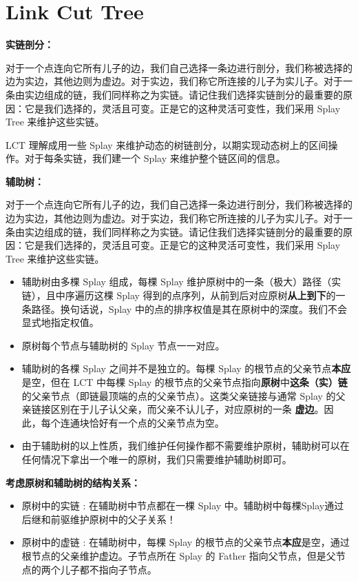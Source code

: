 \section{Link Cut Tree}

\par \noindent \textbf{实链剖分：}
~\\
\par \noindent 对于一个点连向它所有儿子的边，我们自己选择一条边进行剖分，我们称被选择的边为实边，其他边则为虚边。对于实边，我们称它所连接的儿子为实儿子。对于一条由实边组成的链，我们同样称之为实链。请记住我们选择实链剖分的最重要的原因：它是我们选择的，灵活且可变。正是它的这种灵活可变性，我们采用 Splay Tree 来维护这些实链。
~\\
\par \noindent LCT 理解成用一些 Splay 来维护动态的树链剖分，以期实现动态树上的区间操作。对于每条实链，我们建一个 Splay 来维护整个链区间的信息。
~\\
\par \noindent \textbf{辅助树：}
~\\
\par \noindent 对于一个点连向它所有儿子的边，我们自己选择一条边进行剖分，我们称被选择的边为实边，其他边则为虚边。对于实边，我们称它所连接的儿子为实儿子。对于一条由实边组成的链，我们同样称之为实链。请记住我们选择实链剖分的最重要的原因：它是我们选择的，灵活且可变。正是它的这种灵活可变性，我们采用 Splay Tree 来维护这些实链。
\begin{itemize}
\item 辅助树由多棵 Splay 组成，每棵 Splay 维护原树中的一条（极大）路径（实链），且中序遍历这棵 Splay 得到的点序列，从前到后对应原树\textbf{从上到下}的一条路径。换句话说，Splay 中的点的排序权值是其在原树中的深度。我们不会显式地指定权值。
\item 原树每个节点与辅助树的 Splay 节点一一对应。
\item 辅助树的各棵 Splay 之间并不是独立的。每棵 Splay 的根节点的父亲节点\textbf{本应}是空，但在 LCT 中每棵 Splay 的根节点的父亲节点指向\textbf{原树}中\textbf{这条（实）链} 的父亲节点（即链最顶端的点的父亲节点）。这类父亲链接与通常 Splay 的父亲链接区别在于儿子认父亲，而父亲不认儿子，对应原树的一条 \textbf{虚边}。因此，每个连通块恰好有一个点的父亲节点为空。
\item 由于辅助树的以上性质，我们维护任何操作都不需要维护原树，辅助树可以在任何情况下拿出一个唯一的原树，我们只需要维护辅助树即可。
\end{itemize}

\par \noindent \textbf{考虑原树和辅助树的结构关系：}
\begin{itemize}
\item 原树中的实链 : 在辅助树中节点都在一棵 Splay 中。辅助树中每棵Splay通过后继和前驱维护原树中的父子关系！
\item 原树中的虚链 : 在辅助树中，每棵 Splay 的根节点的父亲节点\textbf{本应}是空，通过根节点的父亲维护虚边。子节点所在 Splay 的 Father 指向父节点，但是父节点的两个儿子都不指向子节点。
\end{itemize}

